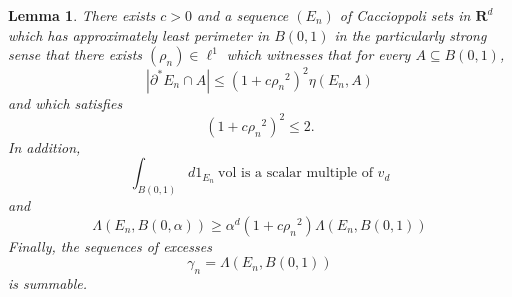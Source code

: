 \documentclass[reqno,12pt,letterpaper]{amsart}
\newcommand{\RR}{\mathbf{R}}
\newcommand{\vol}{\mathrm{vol}}
\newtheorem{lemma}[theorem]{Lemma}
\theoremstyle{definition}
\numberwithin{equation}{section}
\begin{document}
\begin{lemma}
There exists $c > 0$ and a sequence $(E_n)$ of Caccioppoli sets in $\RR^d$ which has approximately least perimeter in $B(0, 1)$ in the particularly strong sense that there exists $(\rho_n) \in \ell^1$ which witnesses that for every $A \subseteq B(0, 1)$,
\begin{equation}\label{DGL ALP}
|\partial^* E_n \cap A| \leq (1 + c{\rho_n}^2)^2 \eta(E_n, A)
\end{equation}
and which satisfies
\begin{equation}\label{DGL bound by 2}
(1 + c{\rho_n}^2)^2 \leq 2.
\end{equation}
In addition,
\begin{equation}\label{DGL conormal axis}
\int_{B(0, 1)} d1_{E_n} ~\vol \text{ is a scalar multiple of } v_d
\end{equation}
and
\begin{equation}\label{scaled contradiction DGL}
\Lambda(E_n, B(0, \alpha)) \geq \alpha^d(1 + c{\rho_n}^2) \Lambda(E_n, B(0, 1))
\end{equation}
Finally, the sequences of excesses
\begin{equation}\label{scaled summable DGL}
\gamma_n = \Lambda(E_n, B(0, 1))
\end{equation}
is summable.
\end{lemma}
\end{document}
